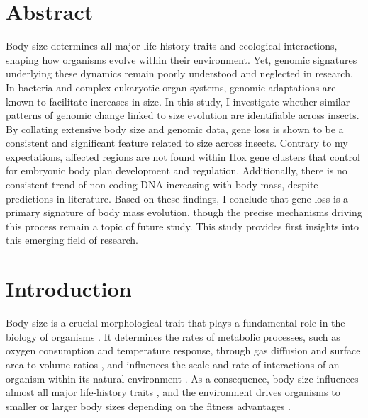 \documentclass[11pt]{article}
\begin{document}
\section*{Abstract}
Body size determines all major life-history traits and ecological interactions, shaping how organisms evolve within their environment. Yet, genomic signatures underlying these dynamics remain poorly understood and neglected in research. In bacteria and complex eukaryotic organ systems, genomic adaptations are known to facilitate increases in size. In this study, I investigate whether similar patterns of genomic change linked to size evolution are identifiable across insects. By collating extensive body size and genomic data, gene loss is shown to be a consistent and significant feature related to size across insects. Contrary to my expectations, affected regions are not found within Hox gene clusters that control for embryonic body plan development and regulation. Additionally, there is no consistent trend of non-coding DNA increasing with body mass, despite predictions in literature. Based on these findings, I conclude that gene loss is a primary signature of body mass evolution, though the precise mechanisms driving this process remain a topic of future study. This study provides first insights into this emerging field of research.
\pagebreak

\tableofcontents
\thispagestyle{empty}
\pagebreak
\setcounter{page}{1}


\linenumbers


\section{Introduction}
Body size is a crucial morphological trait that plays a fundamental role in the biology of organisms \citep{roff1994evolution}. It determines the rates of metabolic processes, such as oxygen consumption and temperature response, through gas diffusion and surface area to volume ratios \citep{gasdiffusion}, and influences the scale and rate of interactions of an organism within its natural environment \citep{Peters_1983, mass-rate, interactions}. As a consequence, body size influences almost all major life-history traits \citep{mass-life-history}, and the environment drives organisms to smaller or larger body sizes depending on the fitness advantages \citep{smallervslarger}. 
\end{document}
